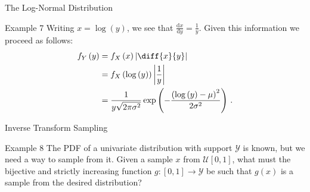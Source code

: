 \documentclass[10pt]{beamer}
\begin{document}
\begin{frame}[fragile]{The Log-Normal Distribution}
\begin{exampleblock}{Example 7}
Writing \(x = \log\left(y\right)\), we see that \(\frac{\mathrm{d}x}{\mathrm{d}y} = \frac{1}{y}\). Given this information we proceed as follows:
\begin{equation*}
    \begin{aligned}
        f_{Y}\left(y\right) &= f_{X}\left(x\right)\left|\diff{x}{y}\right|\\
        &= f_{X}\left(\log\left(y\right)\right)\left|\frac{1}{y}\right|\\
        &= \frac{1}{y\sqrt{2\pi\sigma^2}}\exp\left(-\frac{\left(\log\left(y\right) - \mu\right)^2}{2\sigma^2}\right)\,.
    \end{aligned}
\end{equation*}
\end{exampleblock}
\end{frame}

\begin{frame}[fragile]{Inverse Transform Sampling}
\begin{exampleblock}{Example 8}
The PDF of a univariate distribution with support \(\mathcal{Y}\) is known, but we need a way to sample from it. Given a sample \(x\) from \(\mathcal{U}\left[0, 1\right]\), what must the bijective and strictly increasing function \(g: \left[0,1\right]\rightarrow\mathcal{Y}\) be such that \(g\left(x\right)\) is a sample from the desired distribution?
\end{exampleblock}
\end{frame}
\end{document}

